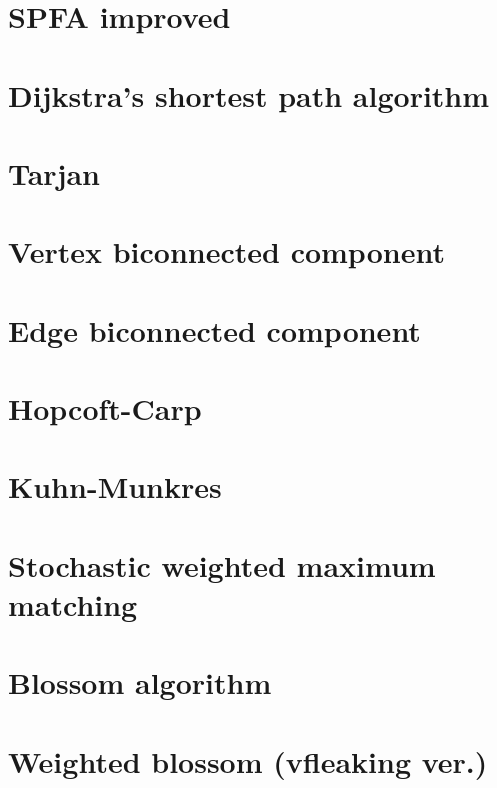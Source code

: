 \documentclass[UTF8,a4paper]{report}
\begin{document}
		\section{SPFA improved}
			
		\section{Dijkstra's shortest path algorithm}
			
		\section{Tarjan}
			
		\section{Vertex biconnected component}
			
		\section{Edge biconnected component}
			
		\section{Hopcoft-Carp}
			
		\section{Kuhn-Munkres}
			
		\section{Stochastic weighted maximum matching}
			
		\section{Blossom algorithm}
			
		\section{Weighted blossom (vfleaking ver.)}	
			
\end{document}
